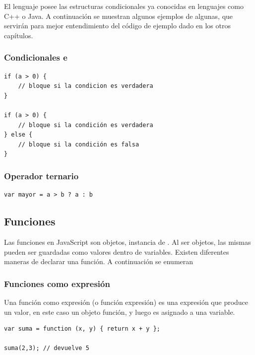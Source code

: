 El lenguaje posee las estructuras condicionales ya conocidas en lenguajes como C++ o Java. A continuación se muestran algunos ejemplos de algunas, que servirán para mejor entendimiento del código de ejemplo dado en los otros capítulos.

\subsubsection{Condicionales  e }

\begin{lstlisting}[title={Ejemplos de \code{if} e \code{if-else}}]
if (a > 0) {
	// bloque si la condicion es verdadera 
}

if (a > 0) {
	// bloque si la condición es verdadera
} else {
	// bloque si la condición es falsa
}
\end{lstlisting}

\subsubsection{Operador ternario }

\begin{lstlisting}[title={Operador ternario \code{?:}}]
var mayor = a > b ? a : b
\end{lstlisting}

\subsection{Funciones}

Las funciones en JavaScript son objetos, instancia de . Al ser objetos, las mismas pueden ser guardadas como valores dentro de variables. Existen diferentes maneras de declarar una función. A continuación se enumeran 

\subsubsection{Funciones como expresión}

Una función como expresión (o función expresión) es una expresión que produce un valor, en este caso un objeto función, y luego es asignado a una variable.

\begin{lstlisting}[title={Función expresión}]
var suma = function (x, y) { return x + y };

suma(2,3); // devuelve 5
\end{lstlisting}

